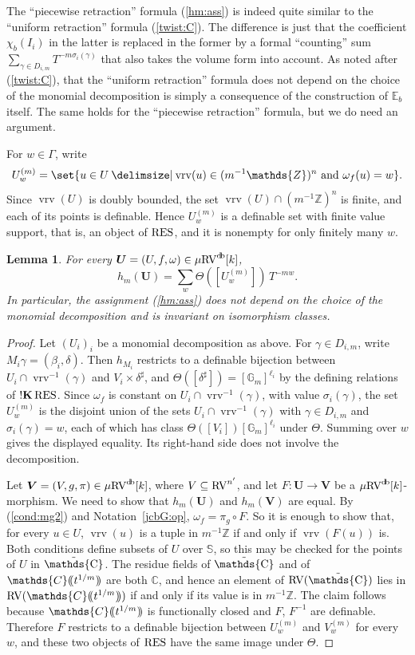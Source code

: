 \documentclass[12pt]{amsart}
\theoremstyle{plain}
\newtheorem{lem}[thm]{Lemma}
\theoremstyle{definition}
\theoremstyle{remark}
\numberwithin{equation}{section}
\theoremstyle{plain}
\newcommand{\RV}{\textup{RV}}
\newcommand{\Z}{\mathds{Z}}
\newcommand{\C}{\mathds{C}}
\newcommand{\G}{\mathds{G}}
\newcommand{\0}{\emptyset}
\newcommand{\dpar}[1]{%
   (\mkern-4mu (#1 )\mkern-4mu )}
\newcommand{\bb}[1]{\mathbb{#1}}
\newcommand{\fun}{\longrightarrow}
\newcommand{\sub}{\subseteq}
\providecommand\given{}
\newcommand\SetSymbol[1][]{%
\nonscript \: #1 \vert
\allowbreak
\nonscript\:
\mathopen{}}
\renewcommand\given{\SetSymbol[\delimsize]}
\newcommand{\mgRV}{{\mu}{\RV}}
\newcommand{\RES}{\textup{RES}}
\DeclareMathOperator{\sggk}{!\mathbf{K}}
\DeclareMathOperator{\vrv}{vrv}
\DeclareMathOperator{\db}{d \! b}
\DeclareMathOperator{\puC}{\tilde \C}
\begin{document}
The ``piecewise retraction'' formula (\ref{hm:ass}) is indeed quite similar to the ``uniform retraction'' formula (\ref{twist:C}). The difference is just that the coefficient $\chi_b(I_i)$ in the latter is replaced in the former by a formal ``counting'' sum $\sum_{\gamma \in D_{i,m}} T^{-m \sigma_i(\gamma)}$ that also takes the volume form into account. As noted after (\ref{twist:C}), that the ``uniform retraction'' formula does not depend on the choice of the monomial decomposition is simply a consequence of the construction of $\bb E_b$ itself. The same holds for the ``piecewise retraction'' formula, but we do need an argument.

For $w \in \Gamma$, write
\[
U^{(m)}_w = \set{u \in U \given \vrv(u) \in (m^{-1}\Z)^n \text{ and } \omega_f(u) = w}.
\]
Since $\vrv(U)$ is doubly bounded, the set $\vrv(U) \cap (m^{-1}\Z)^n$ is finite, and each of its points is definable. Hence $U^{(m)}_w$ is a definable set with finite value support, that is, an object of $\RES$, and it is nonempty for only finitely many $w$.

\begin{lem}\label{muhat:section}
For every $\bm U = (U, f, \omega) \in \mgRV^{\db}[k]$,
\[
h_m(\bm U) = \sum_{w} \Theta([U^{(m)}_w])\, T^{-mw}.
\]
In particular, the  assignment (\ref{hm:ass}) does not depend on the choice of the monomial decomposition and is invariant on isomorphism classes.
\end{lem}
\begin{proof}
Let $(U_i)_i$ be a monomial decomposition as above. For $\gamma \in D_{i,m}$, write $M_i \gamma = (\beta_i, \delta)$. Then $h_{M_i}$ restricts to a definable bijection between $U_i \cap \vrv^{-1}(\gamma)$ and $V_i \times \delta^\sharp$, and $\Theta([\delta^\sharp]) = [\G_m]^{\ell_i}$ by the defining relations of $\sggk \RES$. Since $\omega_f$ is constant on $U_i \cap \vrv^{-1}(\gamma)$, with value $\sigma_i(\gamma)$, the set $U^{(m)}_w$ is the disjoint union of the sets $U_i \cap \vrv^{-1}(\gamma)$ with $\gamma \in D_{i,m}$ and $\sigma_i(\gamma) = w$, each of which has class $\Theta([V_i]) [\G_m]^{\ell_i}$ under $\Theta$. Summing over $w$ gives the displayed equality. Its right-hand side does not involve the decomposition.

Let $\bm V = (V, g, \pi) \in \mgRV^{\db}[k]$, where $V \sub \RV^{n'}$, and let $F : \bm U \fun \bm V$ be a $\mgRV^{\db}[k]$-morphism. We need to show that $h_m(\bm U)$ and $h_m(\bm V)$ are  equal.
By (\ref{cond:mg2}) and Notation~\ref{jcbG:op}, $\omega_f = \pi_g \circ F$. So it is enough to show that, for every $u \in U$, $\vrv(u)$ is a tuple in $m^{-1}\Z$ if and only if $\vrv(F(u))$ is. Both conditions define subsets of $U$ over $\mathbb{S}$, so this may be checked for the points of $U$ in $\puC$. The residue fields of $\puC$ and of $\C \dpar{ t^{1/m} }$ are both $\C$, and hence an element of $\RV(\puC)$ lies in $\RV(\C \dpar{ t^{1/m} })$ if and only if its value is in $m^{-1}\Z$. The claim follows because $\C \dpar{ t^{1/m} }$ is functionally closed and $F$, $F^{-1}$ are definable. Therefore $F$ restricts to a definable bijection between $U^{(m)}_w$ and $V^{(m)}_w$ for every $w$, and these two objects of $\RES$ have the same image under $\Theta$.
\end{proof}
\end{document}
